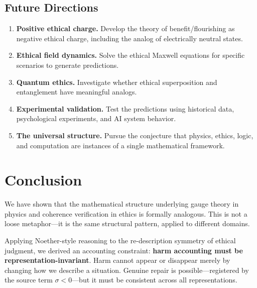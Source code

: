 \documentclass[12pt,letterpaper]{article}
\theoremstyle{definition}
\theoremstyle{remark}
\begin{document}
\subsection{Future Directions}

\begin{enumerate}
    \item \textbf{Positive ethical charge.} Develop the theory of benefit/flourishing as negative ethical charge, including the analog of electrically neutral states.
    
    \item \textbf{Ethical field dynamics.} Solve the ethical Maxwell equations for specific scenarios to generate predictions.
    
    \item \textbf{Quantum ethics.} Investigate whether ethical superposition and entanglement have meaningful analogs.
    
    \item \textbf{Experimental validation.} Test the predictions using historical data, psychological experiments, and AI system behavior.
    
    \item \textbf{The universal structure.} Pursue the conjecture that physics, ethics, logic, and computation are instances of a single mathematical framework.
\end{enumerate}

\section{Conclusion}

We have shown that the mathematical structure underlying gauge theory in physics and coherence verification in ethics is formally analogous. This is not a loose metaphor---it is the same structural pattern, applied to different domains.

Applying Noether-style reasoning to the re-description symmetry of ethical judgment, we derived an accounting constraint: \textbf{harm accounting must be representation-invariant}. Harm cannot appear or disappear merely by changing how we describe a situation. Genuine repair is possible---registered by the source term $\sigma < 0$---but it must be consistent across all representations.
\end{document}
